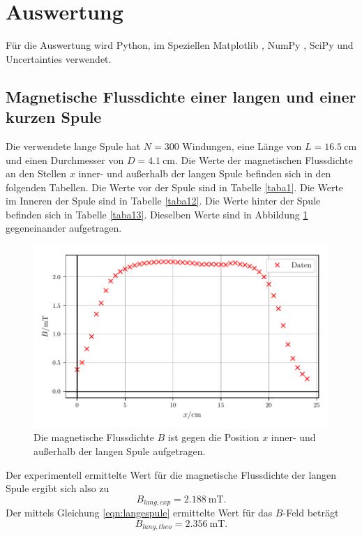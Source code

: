 \section{Auswertung}
\label{sec:Auswertung}

Für die Auswertung wird Python, im Speziellen Matplotlib \cite{matplotlib}, NumPy \cite{numpy},
SciPy \cite{scipy} und Uncertainties \cite{uncertainties} verwendet.

\subsection{Magnetische Flussdichte einer langen und einer kurzen Spule}
Die verwendete lange Spule hat $N = \num{300}$ Windungen, eine Länge
von $L = \SI{16.5}{\centi\meter}$ und einen Durchmesser von
$D = \SI{4.1}{\centi\meter}$.
Die Werte der magnetischen Flussdichte an den Stellen $x$ inner- und außerhalb
der langen Spule befinden sich in den folgenden Tabellen.
Die Werte vor der Spule sind in Tabelle \ref{taba1}. Die Werte im Inneren
der Spule sind in Tabelle \ref{taba12}. Die Werte hinter der Spule befinden
sich in Tabelle \ref{taba13}. %
Dieselben Werte sind in Abbildung \ref{plota1} gegeneinander aufgetragen.




\begin{figure}
    \centering
    \includegraphics{build/plota1.pdf}
    \caption{Die magnetische Flussdichte $B$ ist gegen die Position $x$ inner- 
    und außerhalb der langen Spule aufgetragen.}
    \label{plota1}
\end{figure}

\noindent Der experimentell ermittelte Wert für die 
magnetische Flussdichte der langen Spule ergibt sich also zu
\begin{equation*}
    B_{lang,exp} = \SI{2.188}{\milli\tesla}.
\end{equation*}
Der mittels Gleichung \eqref{eqn:langespule} ermittelte Wert für
das $B$-Feld beträgt
\begin{equation*}
    B_{lang,theo} = \SI{2.356}{\milli\tesla}.
\end{equation*}

